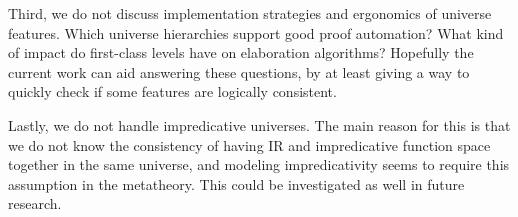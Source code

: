 \documentclass[a4paper,UKenglish,cleveref, autoref, thm-restate]{lipics-v2021}
\theoremstyle{remark}
\theoremstyle{definition}
\begin{document}
Third, we do not discuss implementation strategies and ergonomics of universe
features. Which universe hierarchies support good proof automation? What kind of
impact do first-class levels have on elaboration algorithms? Hopefully the
current work can aid answering these questions, by at least giving a way to quickly
check if some features are logically consistent.

Lastly, we do not handle impredicative universes. The main reason for this is
that we do not know the consistency of having IR and impredicative function
space together in the same universe, and modeling impredicativity seems to
require this assumption in the metatheory. This could be investigated as well
in future research.



\end{document}

